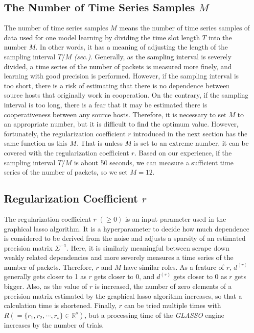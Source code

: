 \documentclass[conference]{IEEEtran}
\begin{document}
\subsection{The Number of Time Series Samples $M$}
The number of time series samples $M$ means the number of time series samples of data used for one model learning by dividing the time slot length $T$ into the number $M$.
In other words, it has a meaning of adjusting the length of the sampling interval $T/M$ {\it (sec.)}.
Generally, as the sampling interval is severely divided, a time series of the number of packets is measured more finely, and learning with good precision is performed.
However, if the sampling interval is too short, there is a risk of estimating that there is no dependence between source hosts that originally work in cooperation.
On the contrary, if the sampling interval is too long, there is a fear that it may be estimated there is cooperativeness between any source hosts.
Therefore, it is necessary to set $M$ to an appropriate number, but it is difficult to find the optimum value.
However, fortunately, the regularization coefficient $r$ introduced in the next section has the same function as this $M$.
That is unless $M$ is set to an extreme number, it can be covered with the regularization coefficient $r$.
Based on our experience, if the sampling interval $T/M$ is about 50 seconds, we can measure a sufficient time series of the number of packets, so we set $M=12$.





\subsection{Regularization Coefficient $r$}
The regularization coefficient $r\;(\geq 0)$ is an input parameter used in the graphical lasso algorithm.
It is a hyperparameter to decide how much dependence is considered to be derived from the noise and adjusts a sparsity of an estimated precision matrix $\Sigma^{-1}$.
Here, it is similarly meaningful between scrape down weakly related dependencies and more severely measures a time series of the number of packets.
Therefore, $r$ and $M$ have similar roles.
As a feature of $r$, $d^{(r)}$ generally gets closer to 1 as $r$ gets closer to 0, and $d^{(r)}$ gets closer to 0 as $r$ gets bigger.
Also, as the value of $r$ is increased, the number of zero elements of a precision matrix estimated by the graphical lasso algorithm increases, so that a calculation time is shortened.
Finally, $r$ can be tried multiple times with $R ( = \{r_1, r_2, \cdots, r_s\}\in\mathbb{R}^s)$, but a processing time of the {\it GLASSO} engine increases by the number of trials.
\end{document}
